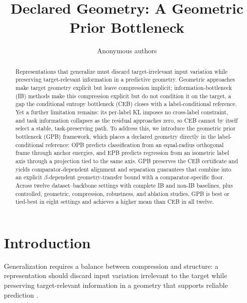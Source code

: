 \documentclass{article} %
\title{Declared Geometry: A Geometric Prior Bottleneck}
\author{Anonymous authors}
\theoremstyle{plain}
\theoremstyle{remark}
\begin{document}
\maketitle

\begin{abstract}
Representations that generalize must discard target-irrelevant input variation
while preserving target-relevant information in a predictive geometry. Geometric approaches make target geometry explicit but leave compression implicit;
information-bottleneck (IB) methods make this compression explicit but do not
condition it on the target, a gap the conditional entropy bottleneck (CEB) closes
with a label-conditional reference. Yet a further limitation remains: its
per-label KL imposes no cross-label constraint, and task information collapses as
the residual approaches zero, so CEB cannot by itself select a stable,
task-preserving path. To address this, we introduce the geometric prior bottleneck (GPB) framework,
which places a declared geometry directly in the label-conditional reference: OPB
predicts classification from an equal-radius orthogonal frame through anchor
energies, and EPB predicts regression from an isometric label axis through a
projection tied to the same axis. GPB preserves the CEB certificate and yields comparator-dependent alignment and
separation guarantees that combine into an explicit $\beta$-dependent
geometry-transfer bound with a comparator-specific floor. Across twelve dataset--backbone settings with complete IB and non-IB baselines,
plus controlled, geometric, compression, robustness, and ablation studies, GPB is
best or tied-best in eight settings and achieves a higher mean than CEB in all
twelve.
\end{abstract}


\section{Introduction}

Generalization requires a balance between compression and structure: a
representation should discard input variation irrelevant to the target while
preserving target-relevant information in a geometry that supports reliable
prediction \citep{tishby2000information,papyan2020prevalence}.
\end{document}
